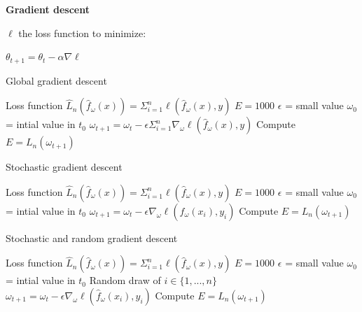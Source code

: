 {\fontsize{12pt}{22pt} \textbf{Gradient descent}\par}

\vspace{5mm}

$\ell$ the loss function to minimize:

$\theta_{t+1}=\theta_t - \alpha \nabla \ell$ \\

\begin{algorithm}
\caption{Global gradient descent}
\begin{algorithmic}
\State Loss function $\widehat{L}_n(\hat{f}_\omega(x))=\Sigma_{i=1}^n \mathcal{\ell}(\hat{f}_\omega(x),y)$
\State $E=1000$
\State $\epsilon$ = small value
\State $\omega_0$ = intial value in $t_0$
\State $\omega_{t+1}=\omega_t-\epsilon\Sigma_{i=1}^n\nabla_\omega{\mathcal{\ell}(\hat{f}_\omega(x),y)}$
\State Compute $E=L_n(\omega_{t+1})$
\EndWhile
\end{algorithmic}
\end{algorithm}


\begin{algorithm}
\caption{Stochastic gradient descent}
\begin{algorithmic}
\State Loss function $\widehat{L}_n(\hat{f}_\omega(x))=\Sigma_{i=1}^n \mathcal{\ell}(\hat{f}_\omega(x),y)$
\State $E=1000$
\State $\epsilon$ = small value
\State $\omega_0$ = intial value in $t_0$
\State $\omega_{t+1}=\omega_t-\epsilon\nabla_\omega{\mathcal{\ell}(\hat{f}_\omega(x_i),y_i)}$
\State Compute $E=L_n(\omega_{t+1})$
\EndFor
\EndWhile
\end{algorithmic}
\end{algorithm}

\begin{algorithm}
\caption{Stochastic and random gradient descent}
\begin{algorithmic}
\State Loss function $\widehat{L}_n(\hat{f}_\omega(x))=\Sigma_{i=1}^n \mathcal{\ell}(\hat{f}_\omega(x),y)$
\State $E=1000$
\State $\epsilon$ = small value
\State $\omega_0$ = intial value in $t_0$
\State Random draw of $i \in \{1,...,n\}$
\State $\omega_{t+1}=\omega_t-\epsilon\nabla_\omega{\mathcal{\ell}(\hat{f}_\omega(x_i),y_i)}$
\State Compute $E=L_n(\omega_{t+1})$
\EndFor
\EndWhile
\end{algorithmic}
\end{algorithm}

\vspace{30mm}

